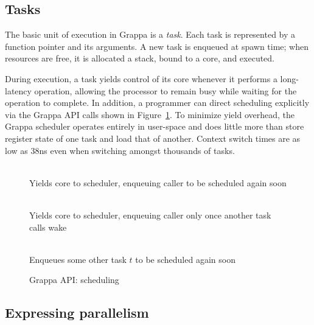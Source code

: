 \subsection{Tasks}

The basic unit of execution in Grappa is a {\em task}. Each task is
represented by a function pointer and its arguments. A new task is enqueued at
spawn time; when resources are free, it is allocated a stack, bound to a core,
and executed.

During execution, a task yields control of its core whenever it performs
a long-latency operation, allowing the processor to remain busy while
waiting for the operation to complete.  In addition,  a programmer can
direct scheduling explicitly via the Grappa API calls shown
in Figure~\ref{fig:scheduling}.
To minimize yield overhead, the Grappa scheduler operates entirely in
user-space and does little more than store register state of one task and load
that of another. Context switch times are as low as 38ns even when switching
amongst thousands of tasks.

\begin{figure}[htbp]
  \begin{center}
    \begin{description}\small
    \item[ \texttt{ yield() } ] \hfill \\
      Yields core to scheduler, enqueuing caller to be scheduled again soon
    \item[ \texttt{ suspend() } ] \hfill \\
      Yields core to scheduler, enqueuing caller only once another task calls wake
    \item[ \texttt{ wake( task * $t$ ) } ] \hfill \\
      Enqueues some other task $t$ to be scheduled again soon
    \end{description}
    \begin{minipage}{0.95\columnwidth}
      \caption{\label{fig:scheduling} Grappa API: scheduling} %
    \end{minipage}
  \end{center}
\end{figure}


\subsection{Expressing parallelism}


